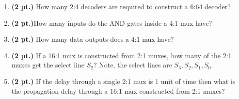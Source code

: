 \documentclass{article}
\begin{document}
\begin{enumerate}
\item {\bf (2 pt.)} How many 2:4 decoders are required to construct a 6:64 decoder?

\item {\bf (2 pt.)}How many inputs do the AND gates inside a 4:1 mux have?

\item {\bf (2 pt.)} How many data outputs does a 4:1 mux have?

\pagebreak{}
\item {\bf (2 pt.)} If a 16:1 mux is constructed from 2:1 muxes, how
many of the 2:1 muxes get the select line $S_2$?  Note, the select lines
are $S_3, S_2, S_1, S_0$.

\item {\bf (2 pt.)} If the delay through a single 2:1 mux is 1 unit of time then
what is the propagation delay through a 16:1 mux constructed from 2:1 muxes?



\end{enumerate}
\end{document}
